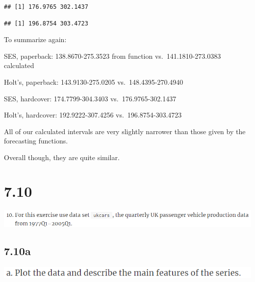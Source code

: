 \documentclass[]{book}
\newenvironment{Shaded}{\begin{snugshade}}{\end{snugshade}}
\newcommand{\DecValTok}[1]{\textcolor[rgb]{0.00,0.00,0.81}{#1}}
\newcommand{\KeywordTok}[1]{\textcolor[rgb]{0.13,0.29,0.53}{\textbf{#1}}}
\newcommand{\NormalTok}[1]{#1}
\newcommand{\OperatorTok}[1]{\textcolor[rgb]{0.81,0.36,0.00}{\textbf{#1}}}
\newcommand{\StringTok}[1]{\textcolor[rgb]{0.31,0.60,0.02}{#1}}
\begin{document}
\begin{verbatim}
## [1] 176.9765 302.1437
\end{verbatim}

\begin{Shaded}
\end{Shaded}

\begin{verbatim}
## [1] 196.8754 303.4723
\end{verbatim}

To summarize again:

SES, paperback: 138.8670-275.3523 from function vs.~141.1810-273.0383 calculated

Holt's, paperback: 143.9130-275.0205 vs.~148.4395-270.4940

SES, hardcover: 174.7799-304.3403 vs.~176.9765-302.1437

Holt's, hardcover: 192.9222-307.4256 vs.~196.8754-303.4723

All of our calculated intervals are very slightly narrower than those given by the forecasting functions.

Overall though, they are quite similar.

\hypertarget{section-11}{%
\section{7.10}\label{section-11}}

\includegraphics{./week4/7.10.png}

\hypertarget{a-6}{%
\subsection{7.10a}\label{a-6}}

\includegraphics{./week4/7.10a.png}
\end{document}
